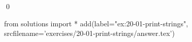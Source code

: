 
\begin{ex}
  \label{ex:20-01-print-strings}
  
  \qed
\end{ex}
\begin{python0}
from solutions import *
add(label="ex:20-01-print-strings",
    srcfilename='exercises/20-01-print-strings/answer.tex')
\end{python0}
